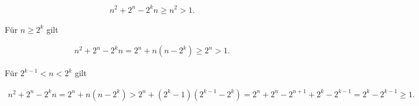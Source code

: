 \begin{solution}
\begin{enumerate}
  \begin{align*}
    n^2 + 2^n - 2^k n \geq n^2 > 1.
  \end{align*}

  Für $n \geq 2^k$ gilt

  \begin{align*}
    n^2 + 2^n - 2^k n = 2^n + n(n - 2^k) \geq 2^n > 1.
  \end{align*}

  Für $2^{k-1} < n < 2^k$ gilt

  \begin{align*}
    n^2 + 2^n - 2^k n = 2^n + n(n - 2^k) > 2^n + (2^k-1)(2^{k-1} - 2^k)
    = 2^n + 2^n - 2^{n+1} + 2^k - 2^{k-1} = 2^k - 2^{k-1} \geq 1.
  \end{align*}

\end{enumerate}


\end{solution}

